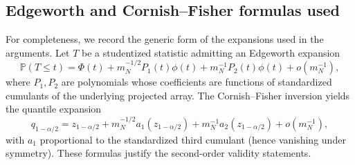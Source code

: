 \documentclass[aos]{imsart}
\theoremstyle{definition}
\theoremstyle{plain}
\begin{document}
\subsection{Edgeworth and Cornish--Fisher formulas used}\label{app:edgeworth}

For completeness, we record the generic form of the expansions used in the arguments.
Let $T$ be a studentized statistic admitting an Edgeworth expansion
\[
\mathbb P(T\le t)=\Phi(t)+m_N^{-1/2} P_1(t)\phi(t)+m_N^{-1} P_2(t)\phi(t)+o(m_N^{-1}),
\]
where $P_1,P_2$ are polynomials whose coefficients are functions of standardized cumulants of the underlying projected array.
The Cornish--Fisher inversion yields the quantile expansion
\[
q_{1-\alpha/2}=z_{1-\alpha/2}+m_N^{-1/2} a_1(z_{1-\alpha/2})+m_N^{-1} a_2(z_{1-\alpha/2})+o(m_N^{-1}),
\]
with $a_1$ proportional to the standardized third cumulant (hence vanishing under symmetry). These formulas justify the second-order validity statements.
\end{document}
